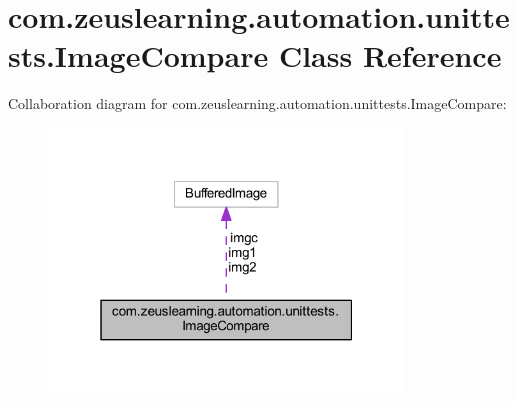 \hypertarget{classcom_1_1zeuslearning_1_1automation_1_1unittests_1_1ImageCompare}{}\section{com.\+zeuslearning.\+automation.\+unittests.\+Image\+Compare Class Reference}
\label{classcom_1_1zeuslearning_1_1automation_1_1unittests_1_1ImageCompare}


Collaboration diagram for com.\+zeuslearning.\+automation.\+unittests.\+Image\+Compare\+:\nopagebreak
\begin{figure}[H]
\begin{center}
\leavevmode
\includegraphics[width=268pt]{de/dd5/classcom_1_1zeuslearning_1_1automation_1_1unittests_1_1ImageCompare__coll__graph}
\end{center}
\end{figure}
